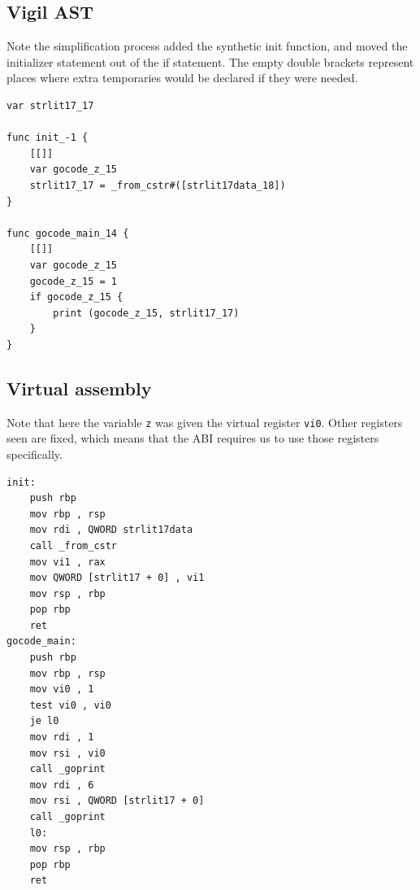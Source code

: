 \documentclass[letterpaper,11pt]{article}
\begin{document}
\subsection{Vigil AST}
Note the simplification process added the synthetic init function, and moved the initializer statement out of the if statement. The empty double brackets represent places where extra temporaries would be declared if they were needed.
\begin{verbatim}
var strlit17_17

func init_-1 {
    [[]]
    var gocode_z_15
    strlit17_17 = _from_cstr#([strlit17data_18])
}

func gocode_main_14 {
    [[]]
    var gocode_z_15
    gocode_z_15 = 1
    if gocode_z_15 {
        print (gocode_z_15, strlit17_17)
    }
}
\end{verbatim}
\subsection{Virtual assembly}
Note that here the variable \texttt{z} was given the virtual register \texttt{vi0}. Other registers seen are fixed, which means that the ABI requires us to use those registers specifically.
\begin{verbatim}
init:
    push rbp
    mov rbp , rsp
    mov rdi , QWORD strlit17data
    call _from_cstr
    mov vi1 , rax
    mov QWORD [strlit17 + 0] , vi1
    mov rsp , rbp
    pop rbp
    ret
gocode_main:
    push rbp
    mov rbp , rsp
    mov vi0 , 1
    test vi0 , vi0
    je l0
    mov rdi , 1
    mov rsi , vi0
    call _goprint
    mov rdi , 6
    mov rsi , QWORD [strlit17 + 0]
    call _goprint
    l0:
    mov rsp , rbp
    pop rbp
    ret
\end{verbatim}
\end{document}
